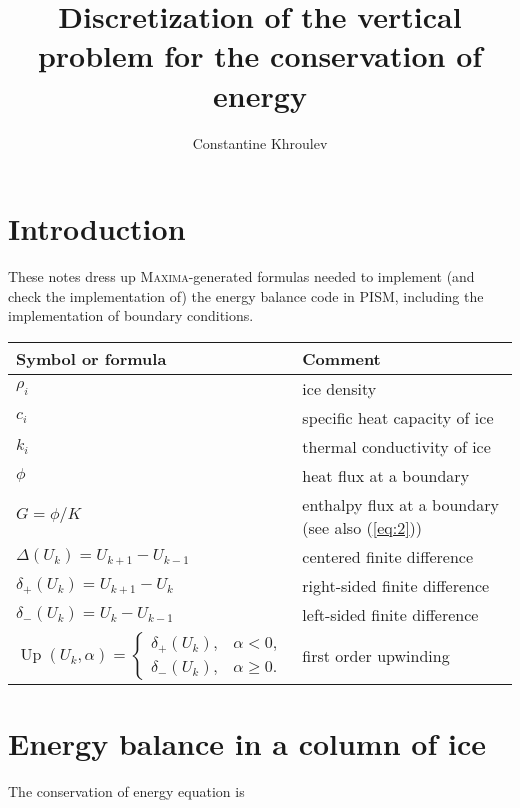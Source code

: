 \documentclass{article}
\begin{document}
\title{Discretization of the vertical problem for the conservation of energy}
\author{Constantine Khroulev}

\maketitle

\section{Introduction}
\label{sec:introduction}

These notes dress up \textsc{Maxima}-generated formulas needed to
implement (and check the implementation of) the energy balance code in
PISM, including the implementation of boundary conditions.

\begin{center}
  \begin{tabular}{ll}
    Symbol or formula & Comment \\
    \hline
    $\rho_{i}$ & ice density\\
    $c_{i}$ & specific heat capacity of ice\\
    $k_{i}$ & thermal conductivity of ice\\
    $\phi$ & heat flux at a boundary\\
    $G = \phi / K$ & enthalpy flux at a boundary (see also (\ref{eq:2}))\\
    $\Delta(U_{k}) = U_{k+1} - U_{k-1}$ & centered finite difference\\
    $\delta_{+}(U_{k}) = U_{k+1} - U_{k}$ & right-sided finite difference\\
    $\delta_{-}(U_{k}) = U_{k} - U_{k-1}$ & left-sided finite difference\\
    $\operatorname{Up}(U_{k}, \alpha) =
    \begin{cases}
      \delta_{+}(U_{k}), & \alpha < 0,\\
      \delta_{-}(U_{k}), & \alpha \ge 0.
    \end{cases}$ & first order upwinding\\
  \end{tabular}
\end{center}

\section{Energy balance in a column of ice}
\label{sec:energy-in-a-column}

The conservation of energy equation is
\end{document}
